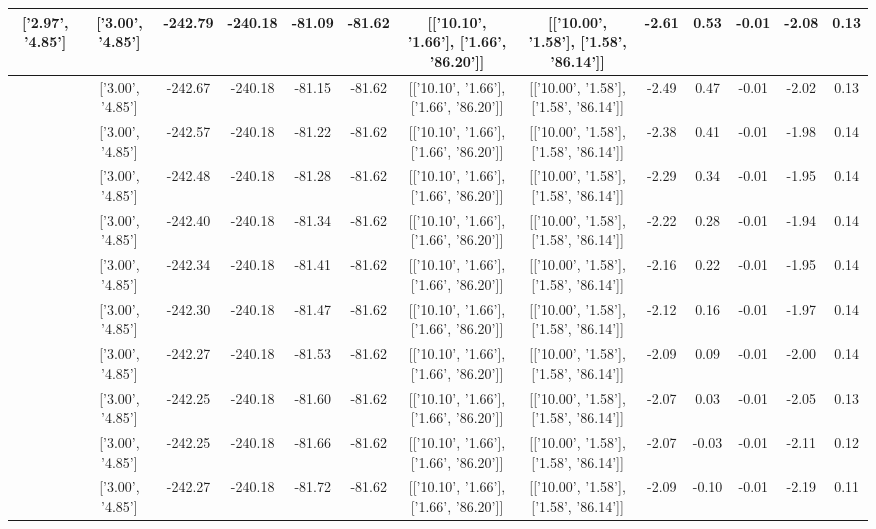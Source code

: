 \begin{table}[htbp]
\begin{adjustbox}{angle=90}
\begin{tabular}{|c|c|c|c|c|c|c|c|c|c|c|c|c|}
 ['2.97', '4.85'] & ['3.00', '4.85'] & -242.79 & -240.18 & -81.09 & -81.62 & [['10.10', '1.66'], ['1.66', '86.20']] & [['10.00', '1.58'], ['1.58', '86.14']] & -2.61 & 0.53 & -0.01 & -2.08 & 0.13\\ \hline
 ['2.97', '4.85'] & ['3.00', '4.85'] & -242.67 & -240.18 & -81.15 & -81.62 & [['10.10', '1.66'], ['1.66', '86.20']] & [['10.00', '1.58'], ['1.58', '86.14']] & -2.49 & 0.47 & -0.01 & -2.02 & 0.13\\ \hline
 ['2.97', '4.85'] & ['3.00', '4.85'] & -242.57 & -240.18 & -81.22 & -81.62 & [['10.10', '1.66'], ['1.66', '86.20']] & [['10.00', '1.58'], ['1.58', '86.14']] & -2.38 & 0.41 & -0.01 & -1.98 & 0.14\\ \hline
 ['2.98', '4.85'] & ['3.00', '4.85'] & -242.48 & -240.18 & -81.28 & -81.62 & [['10.10', '1.66'], ['1.66', '86.20']] & [['10.00', '1.58'], ['1.58', '86.14']] & -2.29 & 0.34 & -0.01 & -1.95 & 0.14\\ \hline
 ['2.98', '4.85'] & ['3.00', '4.85'] & -242.40 & -240.18 & -81.34 & -81.62 & [['10.10', '1.66'], ['1.66', '86.20']] & [['10.00', '1.58'], ['1.58', '86.14']] & -2.22 & 0.28 & -0.01 & -1.94 & 0.14\\ \hline
 ['2.99', '4.85'] & ['3.00', '4.85'] & -242.34 & -240.18 & -81.41 & -81.62 & [['10.10', '1.66'], ['1.66', '86.20']] & [['10.00', '1.58'], ['1.58', '86.14']] & -2.16 & 0.22 & -0.01 & -1.95 & 0.14\\ \hline
 ['2.99', '4.85'] & ['3.00', '4.85'] & -242.30 & -240.18 & -81.47 & -81.62 & [['10.10', '1.66'], ['1.66', '86.20']] & [['10.00', '1.58'], ['1.58', '86.14']] & -2.12 & 0.16 & -0.01 & -1.97 & 0.14\\ \hline
 ['2.99', '4.85'] & ['3.00', '4.85'] & -242.27 & -240.18 & -81.53 & -81.62 & [['10.10', '1.66'], ['1.66', '86.20']] & [['10.00', '1.58'], ['1.58', '86.14']] & -2.09 & 0.09 & -0.01 & -2.00 & 0.14\\ \hline
 ['3.00', '4.85'] & ['3.00', '4.85'] & -242.25 & -240.18 & -81.60 & -81.62 & [['10.10', '1.66'], ['1.66', '86.20']] & [['10.00', '1.58'], ['1.58', '86.14']] & -2.07 & 0.03 & -0.01 & -2.05 & 0.13\\ \hline
 ['3.00', '4.85'] & ['3.00', '4.85'] & -242.25 & -240.18 & -81.66 & -81.62 & [['10.10', '1.66'], ['1.66', '86.20']] & [['10.00', '1.58'], ['1.58', '86.14']] & -2.07 & -0.03 & -0.01 & -2.11 & 0.12\\ \hline
 ['3.01', '4.85'] & ['3.00', '4.85'] & -242.27 & -240.18 & -81.72 & -81.62 & [['10.10', '1.66'], ['1.66', '86.20']] & [['10.00', '1.58'], ['1.58', '86.14']] & -2.09 & -0.10 & -0.01 & -2.19 & 0.11\\ \hline

\end{tabular}
\end{adjustbox}
\end{table}
